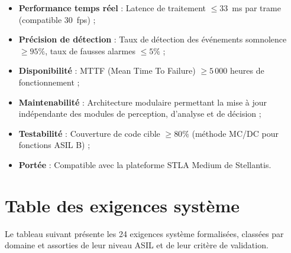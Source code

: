 \documentclass[12pt,a4paper]{report}
\begin{document}
\begin{itemize}
  \item \textbf{Performance temps r\'eel} : Latence de traitement $\leq 33$~ms par trame (compatible 30~fps) ;
  \item \textbf{Pr\'ecision de d\'etection} : Taux de d\'etection des \'ev\'enements somnolence $\geq 95\%$, taux de fausses alarmes $\leq 5\%$ ;
  \item \textbf{Disponibilit\'e} : MTTF (Mean Time To Failure) $\geq 5\,000$ heures de fonctionnement ;
  \item \textbf{Maintenabilit\'e} : Architecture modulaire permettant la mise \`a jour ind\'ependante des modules de perception, d'analyse et de d\'ecision ;
  \item \textbf{Testabilit\'e} : Couverture de code cible $\geq 80\%$ (m\'ethode MC/DC pour fonctions ASIL B) ;
  \item \textbf{Port\'ee} : Compatible avec la plateforme STLA Medium de Stellantis.
\end{itemize}

\section{Table des exigences syst\`eme}

Le tableau suivant pr\'esente les 24 exigences syst\`eme formalis\'ees, class\'ees par domaine et assorties de leur niveau ASIL et de leur crit\`ere de validation.
\end{document}
